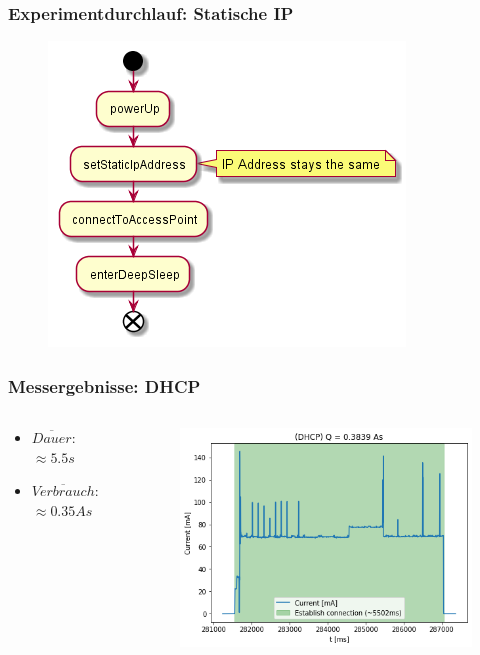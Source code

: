 \begin{frame}
    \frametitle{Experimentdurchlauf: Statische IP}
    \begin{figure}
        \includegraphics[scale=0.6]{../paper/fig/sequence_static_ip.png}
    \end{figure}
\end{frame}

\begin{frame}
    \frametitle{Messergebnisse: DHCP}
    \begin{columns}
        \begin{column}{0.35\textwidth}
            \begin{itemize}
                \item $\overline{Dauer}$: $\approx5.5s$
                \item $\overline{Verbrauch}$: $\approx0.35As$
            \end{itemize}
        \end{column}
        \begin{column}{0.65\textwidth}
            \begin{figure}
                \includegraphics[scale=0.5]{../paper/fig/dhcp.png}
            \end{figure}
        \end{column}
    \end{columns}
\end{frame}

